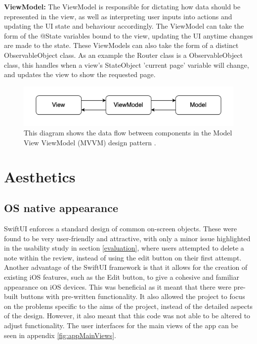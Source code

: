 \documentclass{l4proj}
\begin{document}
\textbf{ViewModel:} The ViewModel is responsible for dictating how data should be represented in the view, as well as interpreting user inputs into actions and updating the UI state and behaviour accordingly. The ViewModel can take the form of the @State variables bound to the view, updating the UI anytime changes are made to the state. These ViewModels can also take the form of a distinct ObservableObject class. As an example the Router class is a ObservableObject class, this handles when a view's StateObject 'current page' variable will change, and updates the view to show the requested page. 

\begin{figure}
    \centering
    \includegraphics[scale=0.5]{images/MVVMDataFlow.png}    
    \caption{This diagram shows the data flow between components in the Model View ViewModel (MVVM) design pattern 
    \citep{bulavin_modern_2020}.}
    \label{fig:MVVMDataFlow} 
\end{figure}


\section{Aesthetics}

\subsection{OS native appearance}

SwiftUI enforces a standard design of common on-screen objects. These were found to be very user-friendly and attractive, with only a minor issue highlighted in the usability study in section \ref{evaluation}, where users attempted to delete a note within the review, instead of using the edit button on their first attempt. Another advantage of the SwiftUI framework is that it allows for the creation of existing iOS features, such as the Edit button, to give a cohesive and familiar appearance on iOS devices. This was beneficial as it meant that there were pre-built buttons with pre-written functionality. It also allowed the project to focus on the problems specific to the aims of the project, instead of the detailed aspects of the design. However, it also meant that this code was not able to be altered to adjust functionality. The user interfaces for the main views of the app can be seen in appendix \ref{fig:appMainViews}.
\end{document}
